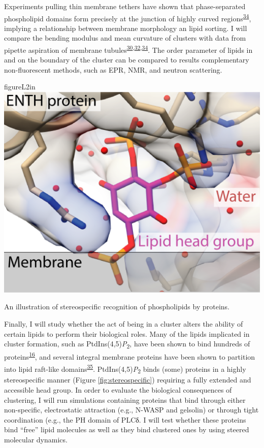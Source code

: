 \documentclass[11pt,notitlepage]{article}
\begin{document}
Experiments pulling thin membrane tethers have shown that
phase-separated phospholipid domains form precisely at the junction of
highly curved
regions\textsuperscript{\protect\hyperlink{ref-XIltXoGI}{34}}, implying
a relationship between membrane morphology an lipid sorting. I will
compare the bending modulus and mean curvature of clusters with data
from pipette aspiration of membrane
tubules\textsuperscript{\protect\hyperlink{ref-oBaB5Z87}{30},\protect\hyperlink{ref-aiu6Tmil}{32},\protect\hyperlink{ref-XIltXoGI}{34}}.
The order parameter of lipids in and on the boundary of the cluster can
be compared to results complementary non-fluorescent methods, such as
EPR, NMR, and neutron scattering.


\begin{wrapfloat}{figure}{L}{2in}
\centering
\includegraphics{content/images/stereospecific.png}
\caption{An illustration of stereospecific recognition of phospholipids
by proteins.}
\label{fig:stereospecific}
\end{wrapfloat}

Finally, I will study whether the act of being in a cluster alters the
ability of certain lipids to perform their biological roles. Many of the
lipids implicated in cluster formation, such as
PtdIns(4,5)\emph{P}\textsubscript{2}, have been shown to bind hundreds
of proteins\textsuperscript{\protect\hyperlink{ref-uyKE7bWV}{16}}, and
several integral membrane proteins have been shown to partition into
lipid raft-like
domains\textsuperscript{\protect\hyperlink{ref-2TfZ4zWV}{35}}.
PtdIns(4,5)\emph{P}\textsubscript{2} binds (some) proteins in a highly
stereospecific manner (Figure \ref{fig:stereospecific}) requiring a
fully extended and accessible head group. In order to evaluate the
biological consequences of clustering, I will run simulations containing
proteins that bind through either non-specific, electrostatic attraction
(e.g., N-WASP and gelsolin) or through tight coordination (e.g., the PH
domain of PLCδ. I will test whether these proteins bind ``free'' lipid
molecules as well as they bind clustered ones by using steered molecular
dynamics.
\end{document}
